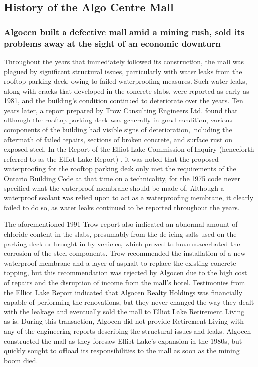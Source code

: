 \documentclass[12pt]{article}
\begin{document}
\subsection{History of the Algo Centre Mall}

\subsubsection{Algocen built a defective mall amid a mining rush, sold its problems away at the sight of an economic downturn}

Throughout the years that immediately followed its construction, the mall was plagued by significant structural issues, particularly with water leaks from the rooftop parking deck, owing to failed waterproofing measures. Such water leaks, along with cracks that developed in the concrete slabs, were reported as early as 1981, and the building's condition continued to deteriorate over the years. Ten years later, a report prepared by Trow Consulting Engineers Ltd. found that although the rooftop parking deck was generally in good condition, various components of the building had visible signs of deterioration, including the aftermath of failed repairs, sections of broken concrete, and surface rust on exposed steel. In the Report of the Elliot Lake Commission of Inquiry (henceforth referred to as the Elliot Lake Report) \cite{AlgoLakeReport1}, it was noted that the proposed waterproofing for the rooftop parking deck only met the requirements of the Ontario Building Code at that time on a technicality, for the 1975 code never specified what the waterproof membrane should be made of. Although a waterproof sealant was relied upon to act as a waterproofing membrane, it clearly failed to do so, as water leaks continued to be reported throughout the years. 

The aforementioned 1991 Trow report also indicated an abnormal amount of chloride content in the slabs, presumably from the de-icing salts used on the parking deck or brought in by vehicles, which proved to have exacerbated the corrosion of the steel components. Trow recommended the installation of a new waterproof membrane and a layer of asphalt to replace the existing concrete topping, but this recommendation was rejected by Algocen due to the high cost of repairs and the disruption of income from the mall's hotel. Testimonies from the Elliot Lake Report indicated that Algocen Realty Holdings was financially capable of performing the renovations, but they never changed the way they dealt with the leakage and eventually sold the mall to Elliot Lake Retirement Living as-is. During this transaction, Algocen did not provide Retirement Living with any of the engineering reports describing the structural issues and leaks. Algocen constructed the mall as they foresaw Elliot Lake's expansion in the 1980s, but quickly sought to offload its responsibilities to the mall as soon as the mining boom died. 
\end{document}
